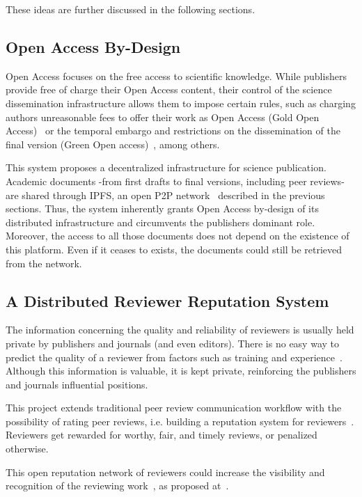These ideas are further discussed in the following sections.

\subsection{Open Access By-Design}
\label{sec:open-access-design}

Open Access focuses on the free access to scientific knowledge. While publishers
provide free of charge their Open Access content, their control of the science
dissemination infrastructure allows them to impose certain rules, such as
charging authors unreasonable fees to offer their work as Open Access (Gold Open
Access)~\cite{solomon2012study} or the temporal embargo and restrictions on the
dissemination of the final version (Green Open access)~\cite{bjork2014anatomy},
among others.

This system proposes a decentralized infrastructure for science publication.
Academic documents -from first drafts to final versions, including peer reviews-
are shared through IPFS, an open P2P network~\cite{benet_ipfs-content_2014}
described in the previous sections. Thus, the system inherently grants Open
Access by-design of its distributed infrastructure and circumvents the
publishers dominant role. Moreover, the access to all those documents does not
depend on the existence of this platform. Even if it ceases to exists, the
documents could still be retrieved from the network.

\subsection{A Distributed Reviewer Reputation System}
\label{sec:distr-revi-reput}

The information concerning the quality and reliability of reviewers is usually
held private by publishers and journals (and even editors). There is no easy way
to predict the quality of a reviewer from factors such as training and
experience~\cite{callaham_relationship_2007}. Although this information is
valuable, it is kept private, reinforcing the publishers and journals
influential positions.

This project extends traditional peer review communication workflow with the
possibility of rating peer reviews, i.e. building a reputation system for
reviewers~\cite{resnick2000reputation}. Reviewers get rewarded for worthy, fair,
and timely reviews, or penalized otherwise.
    
This open reputation network of reviewers could increase the visibility and
recognition of the reviewing work~\cite{rajpert-de_meyts_rewarding_2016}, as
proposed at~\cite{peere2018}.

